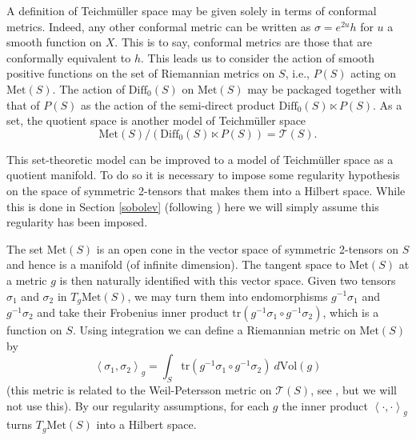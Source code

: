 \documentclass{amsart}
\begin{document}
A definition of Teichm\"uller space may be given solely in terms of conformal metrics. 
Indeed, any other conformal metric can be written as $\sigma = e^{2u}h$ for $u$ a smooth function on $X$. 
This is to say, conformal metrics are those that are conformally equivalent to $h$. 
This leads us to consider the action of smooth positive functions on the set of Riemannian metrics on $S$, i.e., $P(S)$ acting on $\mathrm{Met}(S)$. 
The action of $\mathrm{Diff}_0(S)$ on $\mathrm{Met}(S)$ may be packaged together with that of $P(S)$ as the action of the semi-direct product $\mathrm{Diff}_0(S) \ltimes P(S)$. 
As a set, the quotient space is another model of Teichm\"uller space
\[
\mathrm{Met}(S)/(\mathrm{Diff}_0(S) \ltimes P(S)) = \mathcal{T}(S).
\]

This set-theoretic model can be improved to a model of Teichm\"uller space as a quotient manifold. To do so it is necessary to impose some regularity hypothesis on the space of symmetric 2-tensors that makes them into a Hilbert space. While this is done in Section \ref{sobolev} (following \cite{tromba1992}) here we will simply assume this regularity has been imposed.  

The set $\mathrm{Met}(S)$ is an open cone in the vector space of symmetric 2-tensors on $S$ and hence is a manifold (of infinite dimension). 
The tangent space to $\mathrm{Met}(S)$ at a metric $g$ is then naturally identified with this vector space. 
Given two tensors $\sigma_1$ and $\sigma_2$ in $T_g \mathrm{Met}(S)$, we may turn them into endomorphisms $g^{-1}\sigma_1$ and $g^{-1}\sigma_2$ and take their Frobenius inner product $\mathrm{tr}( g^{-1}\sigma_1 \circ g^{-1}\sigma_2)$, which is a function on $S$. 
Using integration we can define a Riemannian metric on $\mathrm{Met}(S)$ by 
\[
\left< \sigma_1, \sigma_2 \right>_g = \int_S \mathrm{tr}( g^{-1}\sigma_1 \circ g^{-1}\sigma_2) \ d\mathrm{Vol}(g)
\]
(this metric is related to the Weil-Petersson metric on $\mathcal{T}(S)$, see \cite{tromba1992}, but we will not use this). By our regularity assumptions, for each $g$ the inner product $\left< \cdot, \cdot \right>_g$ turns $T_g\mathrm{Met}(S)$ into a Hilbert space. 
\end{document}
